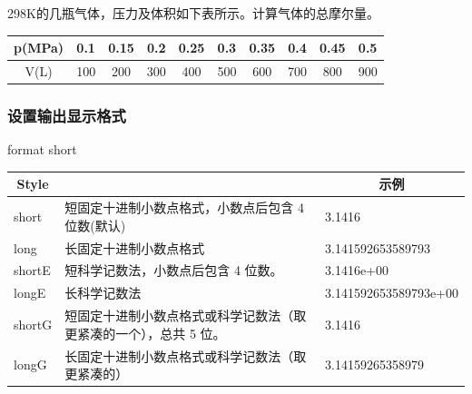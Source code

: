 \documentclass[dvipsnames, svgnames, x11names]{beamer}
\begin{document}
\begin{frame}[t]
    \frametitle{}
    \begin{question}
        298K的几瓶气体，压力及体积如下表所示。计算气体的总摩尔量。
        \begin{table}
            \centering
            \begin{tabular}{cccccccccc}
                \bottomrule
                p(MPa) & 0.1 & 0.15 & 0.2 & 0.25 & 0.3 & 0.35 & 0.4 & 0.45 & 0.5\\ \hline
                V(L) & 100 & 200 & 300 & 400 & 500 & 600 & 700 & 800 & 900\\ \toprule
            \end{tabular}
        \end{table}
    \end{question}
\end{frame}


\begin{frame}[fragile]
    \frametitle{设置输出显示格式}
\begin{codeblock}{}
format short
\end{codeblock}
\vspace{-6pt}
\begin{table}[]
    \begin{tabularx}{\textwidth} { 
         l
         >{\raggedright\arraybackslash}X 
         l 
         }
    \toprule
    \multicolumn{1}{c}{\textbf{Style}} & \multicolumn{1}{c}{\textbf{结果}}                                    & \multicolumn{1}{c}{\textbf{示例}} \\ \midrule
    short                              & 短固定十进制小数点格式，小数点后包含 4   位数(默认)                                & 3.1416                          \\
    long                               & 长固定十进制小数点格式            & 	3.141592653589793                   \\
    shortE                             & 短科学记数法，小数点后包含 4 位数。                                                & 3.1416e+00                        \\
    longE                              & 长科学记数法                 & 	3.141592653589793e+00                       \\
    shortG                             & 短固定十进制小数点格式或科学记数法（取更紧凑的一个），总共 5   位。                               & 3.1416                          \\
    longG                              & 长固定十进制小数点格式或科学记数法（取更紧凑的） & 3.14159265358979                     \\ \bottomrule
    \end{tabularx}
    \end{table}
\end{frame}
\end{document}
